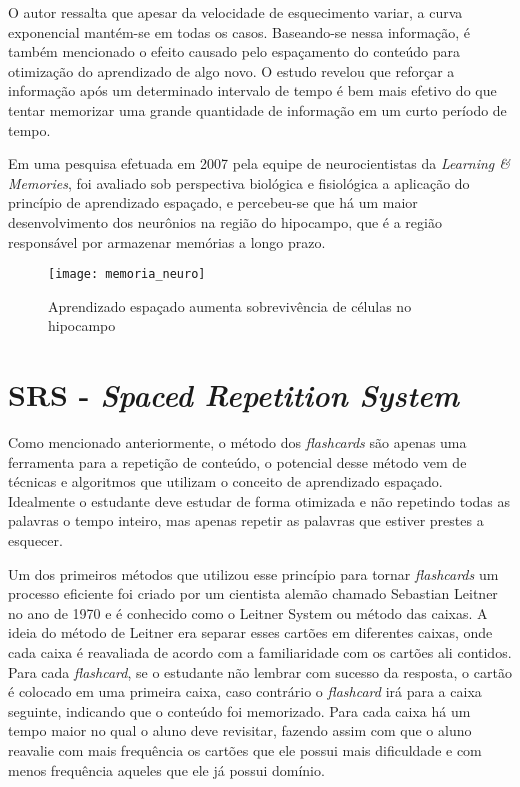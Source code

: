 O autor ressalta que apesar da velocidade de esquecimento variar, a curva exponencial mantém-se em todas os casos. Baseando-se nessa informação, é também mencionado o efeito causado pelo espaçamento do conteúdo para otimização do aprendizado de algo novo. O estudo revelou que reforçar a informação após um determinado intervalo de tempo é bem mais efetivo do que tentar memorizar uma grande quantidade de informação em um curto período de tempo. 

Em uma pesquisa efetuada em 2007 pela equipe de neurocientistas da \textit{Learning \& Memories}, foi avaliado sob perspectiva biológica e fisiológica a aplicação do princípio de aprendizado espaçado, e percebeu-se que há um maior desenvolvimento dos neurônios na região do hipocampo, que é a região responsável por armazenar memórias a longo prazo.

\begin{figure}[H]
	\caption{\label{fig:memoria_neuro}Aprendizado espaçado aumenta sobrevivência de células no hipocampo}
\begin{center}
	\texttt{[image: memoria\_neuro]}
\end{center}
\end{figure}

\section{SRS - \textit{Spaced Repetition System}}
Como mencionado anteriormente, o método dos \textit{flashcards} são apenas uma ferramenta para a repetição de conteúdo, o potencial desse método vem de técnicas e algoritmos que utilizam o conceito de aprendizado espaçado. Idealmente o estudante deve estudar de forma otimizada e não repetindo todas as palavras o tempo inteiro, mas apenas repetir as palavras que estiver prestes a esquecer.

Um dos primeiros métodos que utilizou esse princípio para tornar \textit{flashcards} um processo eficiente foi criado por um cientista alemão chamado Sebastian Leitner no ano de 1970 e é conhecido como o Leitner System ou método das caixas. A ideia do método de Leitner era separar esses cartões em diferentes caixas, onde cada caixa é reavaliada de acordo com a familiaridade com os cartões ali contidos. Para cada \textit{flashcard}, se o estudante não lembrar com sucesso da resposta, o cartão é colocado em uma primeira caixa, caso contrário o \textit{flashcard} irá para a caixa seguinte, indicando que o conteúdo foi memorizado. Para cada caixa há um tempo maior no qual o aluno deve revisitar, fazendo assim com que o aluno reavalie com mais frequência os cartões que ele possui mais dificuldade e com menos frequência aqueles que ele já possui domínio.

